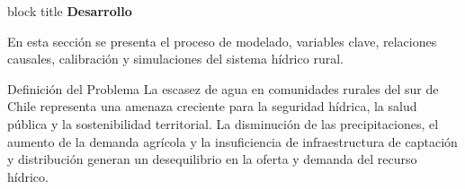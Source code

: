 \documentclass[aspectratio=169]{beamer}
\begin{document}

{
\begin{frame}[plain]
    \vspace*{1.5cm}
    \begin{center}
        \begin{beamercolorbox}[rounded=true, shadow=true, sep=2em, wd=0.9\textwidth]{block title}
            {\fontsize{36pt}{40pt}\selectfont \textbf{Desarrollo}}
        \end{beamercolorbox}
        \vspace{1cm}
        {\Large En esta sección se presenta el proceso de modelado, variables clave, relaciones causales, calibración y simulaciones del sistema hídrico rural.}
    \end{center}
\end{frame}
}

\begin{frame}{Definición del Problema}
La escasez de agua en comunidades rurales del sur de Chile representa una amenaza creciente para la seguridad hídrica, la salud pública y la sostenibilidad territorial. La disminución de las precipitaciones, el aumento de la demanda agrícola y la insuficiencia de infraestructura de captación y distribución generan un desequilibrio en la oferta y demanda del recurso hídrico.
\end{frame}
\end{document}
